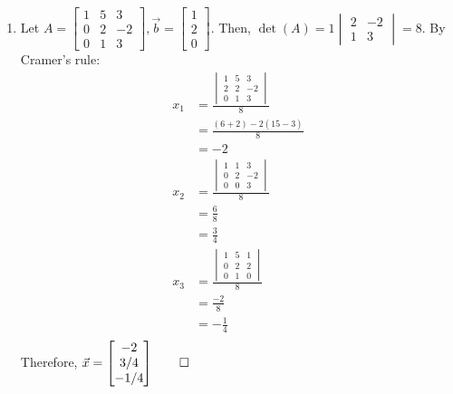 \documentclass[12pt, a4paper]{article}
\begin{document}
\begin{enumerate}[Q\arabic*.]
  \item Let $A = \begin{bmatrix}1&5&3\\0&2&-2\\0&1&3\end{bmatrix}, \vec{b} = \begin{bmatrix}1\\2\\0\end{bmatrix}$. Then, $\det(A) = 1\begin{vmatrix}2&-2\\1&3\end{vmatrix} = 8$. By Cramer's rule:
    \begin{align*}
      x_1 &= \frac{\begin{vmatrix}1&5&3\\2&2&-2\\0&1&3\end{vmatrix}}{8} \\
                &= \frac{(6+2)-2(15-3)}{8} \\
                &= -2 \\
      x_2 &= \frac{\begin{vmatrix}1&1&3\\0&2&-2\\0&0&3\end{vmatrix}}{8} \\
                &= \frac{6}{8} \\
                &= \frac{3}{4} \\
      x_3 &= \frac{\begin{vmatrix}1&5&1\\0&2&2\\0&1&0\end{vmatrix}}{8} \\
                &= \frac{-2}{8} \\
                &= -\frac{1}{4} \\
    \end{align*}
    Therefore, $\vec{x} = \begin{bmatrix}-2\\3/4\\-1/4\end{bmatrix} \qed$


\end{enumerate}
\end{document}
